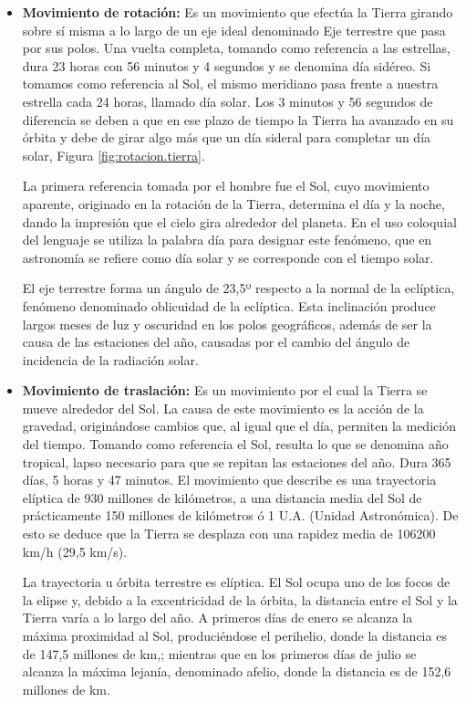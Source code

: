 \documentclass[a4paper,12pt,twoside]{article}
\begin{document}
\begin{itemize}
	\item \textbf{Movimiento de rotaci\'on:} Es un movimiento que efectúa la Tierra girando sobre sí misma a lo largo de un eje ideal denominado Eje terrestre que pasa por sus polos. Una vuelta completa, tomando como referencia a las estrellas, dura 23 horas con 56 minutos y 4 segundos y se denomina día sidéreo. Si tomamos como referencia al Sol, el mismo meridiano pasa frente a nuestra estrella cada 24 horas, llamado día solar. Los 3 minutos y 56 segundos de diferencia se deben a que en ese plazo de tiempo la Tierra ha avanzado en su órbita y debe de girar algo más que un día sideral para completar un día solar, Figura \ref{fig:rotacion.tierra}.

La primera referencia tomada por el hombre fue el Sol, cuyo movimiento aparente, originado en la rotación de la Tierra, determina el día y la noche, dando la impresión que el cielo gira alrededor del planeta. En el uso coloquial del lenguaje se utiliza la palabra día para designar este fenómeno, que en astronomía se refiere como día solar y se corresponde con el tiempo solar.

El eje terrestre forma un ángulo de 23,5º respecto a la normal de la eclíptica, fenómeno denominado oblicuidad de la eclíptica. Esta inclinación produce largos meses de luz y oscuridad en los polos geográficos, además de ser la causa de las estaciones del año, causadas por el cambio del ángulo de incidencia de la radiación solar.

        \item \textbf{Movimiento de traslación:} Es un movimiento por el cual la Tierra se mueve alrededor del Sol. La causa de este movimiento es la acción de la gravedad, originándose cambios que, al igual que el día, permiten la medición del tiempo. Tomando como referencia el Sol, resulta lo que se denomina año tropical, lapso necesario para que se repitan las estaciones del año. Dura 365 días, 5 horas y 47 minutos. El movimiento que describe es una trayectoria elíptica de 930 millones de kilómetros, a una distancia media del Sol de prácticamente 150 millones de kilómetros ó 1 U.A. (Unidad Astronómica). De esto se deduce que la Tierra se desplaza con una rapidez media de 106200 km/h (29,5 km/s).

La trayectoria u órbita terrestre es elíptica. El Sol ocupa uno de los focos de la elipse y, debido a la excentricidad de la órbita, la distancia entre el Sol y la Tierra varía a lo largo del año. A primeros días de enero se alcanza la máxima proximidad al Sol, produciéndose el perihelio, donde la distancia es de 147,5 millones de km,; mientras que en los primeros días de julio se alcanza la máxima lejanía, denominado afelio, donde la distancia es de 152,6 millones de km.


\end{itemize}
\end{document}
